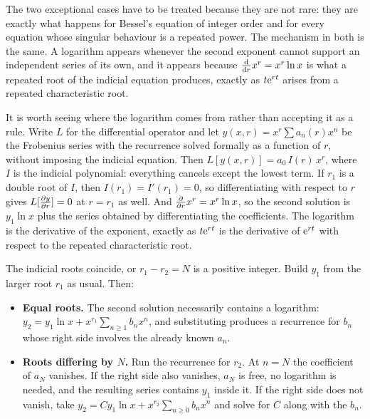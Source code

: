 The two exceptional cases have to be treated because they are not rare: they are exactly what happens for Bessel's equation of integer order and for every equation whose singular behaviour is a repeated power. The mechanism in both is the same. A logarithm appears whenever the second exponent cannot support an independent series of its own, and it appears because $\frac{\mathrm{d}}{\mathrm{d}r}x^{r}=x^{r}\ln x$ is what a repeated root of the indicial equation produces, exactly as $t\mathrm{e}^{rt}$ arises from a repeated characteristic root.

It is worth seeing where the logarithm comes from rather than accepting it as a rule. Write $L$ for the differential operator and let $y(x,r)=x^{r}\sum a_n(r)x^{n}$ be the Frobenius series with the recurrence solved formally as a function of $r$, without imposing the indicial equation. Then $L[y(x,r)]=a_0\,I(r)\,x^{r}$, where $I$ is the indicial polynomial: everything cancels except the lowest term. If $r_1$ is a double root of $I$, then $I(r_1)=I'(r_1)=0$, so differentiating with respect to $r$ gives $L[\frac{\partial y}{\partial r}]=0$ at $r=r_1$ as well. And $\frac{\partial }{\partial r}x^{r}=x^{r}\ln x$, so the second solution is $y_1\ln x$ plus the series obtained by differentiating the coefficients. The logarithm is the derivative of the exponent, exactly as $t\mathrm{e}^{rt}$ is the derivative of $\mathrm{e}^{rt}$ with respect to the repeated characteristic root.

\cue The indicial roots coincide, or $r_1-r_2=N$ is a positive integer.
\method Build $y_1$ from the larger root $r_1$ as usual. Then:
\begin{itemize}
\item \textbf{Equal roots.} The second solution necessarily contains a logarithm:
$y_2=y_1\ln x+x^{r_1}\sum_{n\ge1}b_nx^{n}$, and substituting produces a recurrence for $b_n$ whose right side involves the already known $a_n$.
\item \textbf{Roots differing by $N$.} Run the recurrence for $r_2$. At $n=N$ the coefficient of $a_N$ vanishes. If the right side also vanishes, $a_N$ is free, no logarithm is needed, and the resulting series contains $y_1$ inside it. If the right side does not vanish, take
$y_2=Cy_1\ln x+x^{r_2}\sum_{n\ge0}b_nx^{n}$ and solve for $C$ along with the $b_n$.
\end{itemize}

